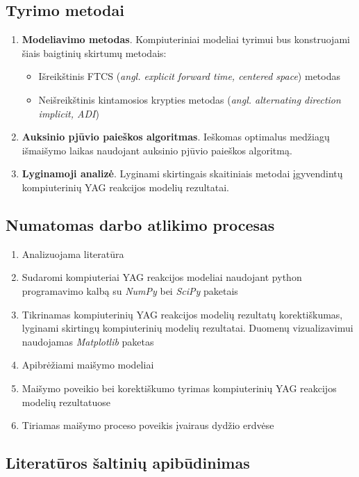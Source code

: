 \documentclass[]{VUMIFTemplateClass}
\begin{document}
\subsection{Tyrimo metodai}

\begin{enumerate}
    \item \textbf{Modeliavimo metodas}. Kompiuteriniai modeliai tyrimui bus konstruojami šiais baigtinių skirtumų metodais:
    \begin{itemize}
        \item Išreikštinis FTCS (\textit{angl. explicit forward time, centered space}) metodas
        \item Neišreikštinis kintamosios krypties metodas (\textit{angl. alternating direction implicit, ADI}) 
    \end{itemize}
    \item \textbf{Auksinio pjūvio paieškos algoritmas}. Ieškomas optimalus medžiagų išmaišymo laikas naudojant auksinio pjūvio paieškos algoritmą.
    \item \textbf{Lyginamoji analizė}. Lyginami skirtingais skaitiniais metodai įgyvendintų kompiuterinių YAG reakcijos modelių rezultatai. 
\end{enumerate}


\subsection{Numatomas darbo atlikimo procesas}

\begin{enumerate}
    \item Analizuojama literatūra 
    \item Sudaromi kompiuteriai YAG reakcijos modeliai naudojant python programavimo kalbą su \textit{NumPy} bei \textit{SciPy} paketais
    \item Tikrinamas kompiuterinių YAG reakcijos modelių rezultatų korektiškumas, lyginami skirtingų kompiuterinių modelių rezultatai. Duomenų vizualizavimui naudojamas \textit{Matplotlib} paketas
    \item Apibrėžiami maišymo modeliai
    \item Maišymo poveikio bei korektiškumo tyrimas kompiuterinių YAG reakcijos modelių rezultatuose 
    \item Tiriamas maišymo proceso poveikis įvairaus dydžio erdvėse
\end{enumerate}

\subsection{Literatūros šaltinių apibūdinimas}
\end{document}
